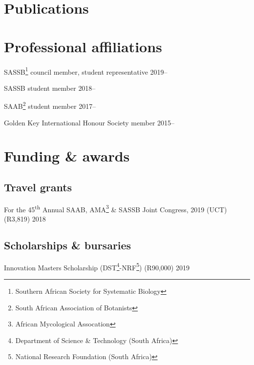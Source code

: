 \documentclass[10pt]{article}
\begin{document}
\section*{Publications} %



\bigskip

\section*{Professional affiliations} %

SASSB\footnote{Southern African Society for Systematic Biology} council member, 
student representative                                    \hfill {\small 2019--}

SASSB student member                                      \hfill {\small 2018--}

SAAB\footnote{South African Association of Botanists} student member
                                                          \hfill {\small 2017--}

Golden Key International Honour Society member            \hfill {\small 2015--}

\section*{Funding \& awards} %

\subsection*{Travel grants}

For the 45\textsuperscript{th} Annual SAAB, AMA\footnote{African Mycological
Assocation} \& SASSB Joint Congress, 2019 (UCT) (R3,819)    \hfill {\small 2018}

\subsection*{Scholarships \& bursaries}

Innovation Masters Scholarship (DST\footnote{Department of Science \&
Technology (South Africa)}-NRF\footnote{National Research Foundation (South 
Africa)}) (R90,000)                                         \hfill {\small 2019}
\end{document}
